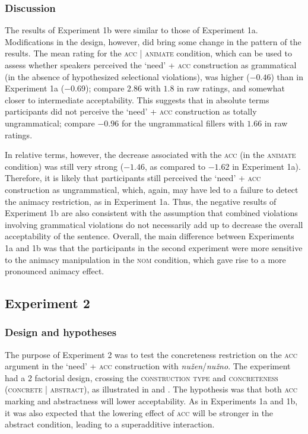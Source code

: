 \documentclass[output=paper]{langscibook}
\begin{document}
\subsubsection{Discussion}

The results of Experiment 1b were similar to those of Experiment 1a. Modifications in the design, however, did bring some change in the pattern of the results. The mean rating for the \textsc{acc} | \textsc{animate} condition, which can be used to assess whether speakers perceived the `need' + \textsc{acc} construction as grammatical (in the absence of hypothesized selectional violations), was higher ($-0.46$) than in Experiment 1a ($-0.69$); compare $2.86$ with $1.8$ in raw ratings, and somewhat closer to intermediate acceptability. This suggests that in absolute terms participants did not perceive the `need' + \textsc{acc} construction as totally ungrammatical; compare $-0.96$ for the ungrammatical fillers with $1.66$ in raw ratings.

In relative terms, however, the decrease associated with the \textsc{acc} (in the \textsc{animate} condition) was still very strong ($-1.46$, as compared to $-1.62$ in Experiment 1a). Therefore, it is likely that participants still perceived the `need' + \textsc{acc} construction as ungrammatical, which, again, may have led to a failure to detect the animacy restriction, as in Experiment 1a. Thus, the negative results of Experiment 1b are also consistent with the assumption that combined violations involving grammatical violations do not necessarily add up to decrease the overall acceptability of the sentence. Overall, the main difference between Experiments 1a and 1b was that the participants in the second experiment were more sensitive to the animacy manipulation in the \textsc{nom} condition, which gave rise to a more pronounced animacy effect.

\subsection{Experiment 2}

\subsubsection{Design and hypotheses}

The purpose of Experiment 2 was to test the concreteness restriction on the \textsc{acc} argument in the `need' + \textsc{acc} construction with \textit{nužen}/\textit{nužno}. The experiment had a 2 factorial design, crossing the \textsc{construction type} and \textsc{concreteness} (\textsc{concrete} | \textsc{abstract}), as illustrated in  and . The hypothesis was that both \textsc{acc} marking and abstractness will lower acceptability. As in Experiments 1a and 1b, it was also expected that the lowering effect of \textsc{acc} will be stronger in the abstract condition, leading to a superadditive interaction.
\end{document}
